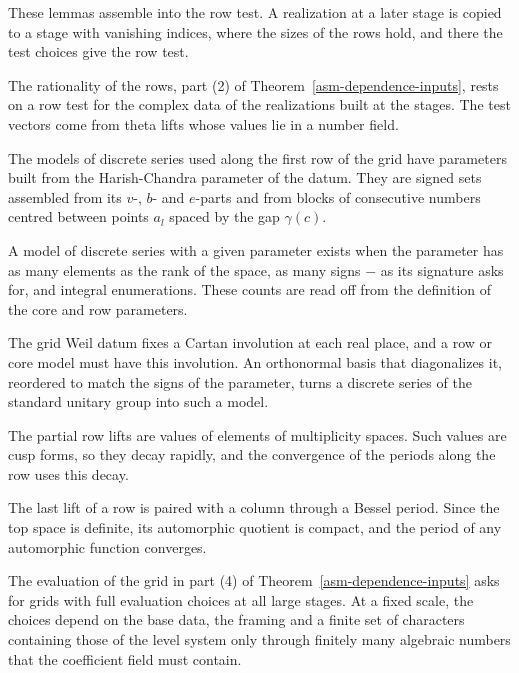 These lemmas assemble into the row test. A realization at a later
stage is copied to a stage with vanishing indices, where the sizes of the rows
hold, and there the test choices give the row test.

The rationality of the rows, part (2) of Theorem~\ref{asm-dependence-inputs},
rests on a row test for the complex data of the realizations built at the
stages. The test vectors come from theta lifts whose values lie in a number
field.

The models of discrete series used along the first row of the grid have
parameters built from the Harish-Chandra parameter of the datum. They are
signed sets assembled from its $v$-, $b$- and $e$-parts and from blocks of
consecutive numbers centred between points $a_l$ spaced by the gap
$\gamma(c)$.

A model of discrete series with a given parameter exists when the parameter has
as many elements as the rank of the space, as many signs $-$ as its signature
asks for, and integral enumerations. These counts are read off from the
definition of the core and row parameters.

The grid Weil datum fixes a Cartan involution at each real place, and a row or
core model must have this involution. An orthonormal basis that diagonalizes
it, reordered to match the signs of the parameter, turns a discrete series of
the standard unitary group into such a model.

The partial row lifts are values of elements of multiplicity spaces. Such
values are cusp forms, so they decay rapidly, and the convergence of the
periods along the row uses this decay.

The last lift of a row is paired with a column through a Bessel period. Since
the top space is definite, its automorphic quotient is compact, and the
period of any automorphic function converges.

The evaluation of the grid in part (4) of Theorem~\ref{asm-dependence-inputs}
asks for grids with full evaluation choices at all large stages. At a fixed
scale, the choices depend on the base data, the framing and a finite set of
characters containing those of the level system only through finitely many
algebraic numbers that the coefficient field must contain.

